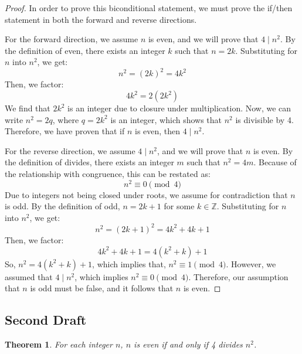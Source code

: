 \documentclass[12pt]{article}
\newtheorem*{theorem}{Theorem}
\theoremstyle{definition}
\begin{document}
\begin{proof}
    In order to prove this biconditional statement, we must prove the if/then statement in both the forward and reverse directions.

    \vspace{1em}

    For the forward direction, we assume \( n \) is even, and we will prove that \( 4 \mid n^2 \). By the definition of even, there exists an integer \( k \) such that \( n = 2k \). Substituting for \( n \) into \( n^2 \), we get:
    \[ n^2 = (2k)^2 = 4k^2 \]
    Then, we factor:
    \[ 4k^2 = 2(2k^2) \]
    We find that \( 2k^2 \) is an integer due to closure under multiplication. Now, we can write \( n^2 = 2q \), where \( q = 2k^2 \) is an integer, which shows that \( n^2 \) is divisible by 4. Therefore, we have proven that if \( n \) is even, then \( 4 \mid n^2 \).

    \vspace{1em}

    For the reverse direction, we assume \( 4 \mid n^2 \), and we will prove that \( n \) is even. By the definition of divides, there exists an integer \( m \) such that \( n^2 = 4m \). Because of the relationship with congruence, this can be restated as:
    \[ n^2 \equiv 0 \pmod{4} \]
    Due to integers not being closed under roots, we assume for contradiction that \( n \) is odd. By the definition of odd, \( n = 2k + 1 \) for some \( k \in \mathbb{Z} \). Substituting for \( n \) into \( n^2 \), we get:
    \[ n^2 = (2k + 1)^2 = 4k^2 + 4k + 1 \]
    Then, we factor:
    \[ 4k^2 + 4k + 1 = 4(k^2 + k) + 1 \]
    So, \( n^2 = 4(k^2 + k) + 1 \), which implies that, \( n^2 \equiv 1 \pmod{4} \). However, we assumed that \( 4 \mid n^2 \), which implies \( n^2 \equiv 0 \pmod{4} \). Therefore, our assumption that \( n \) is odd must be false, and it follows that \( n \) is even.
\end{proof}

\newpage

\subsection{Second Draft}

\begin{theorem}
    For each integer \( n \), \( n \) is even if and only if 4 divides \( n^2 \).
\end{theorem}
\end{document}
